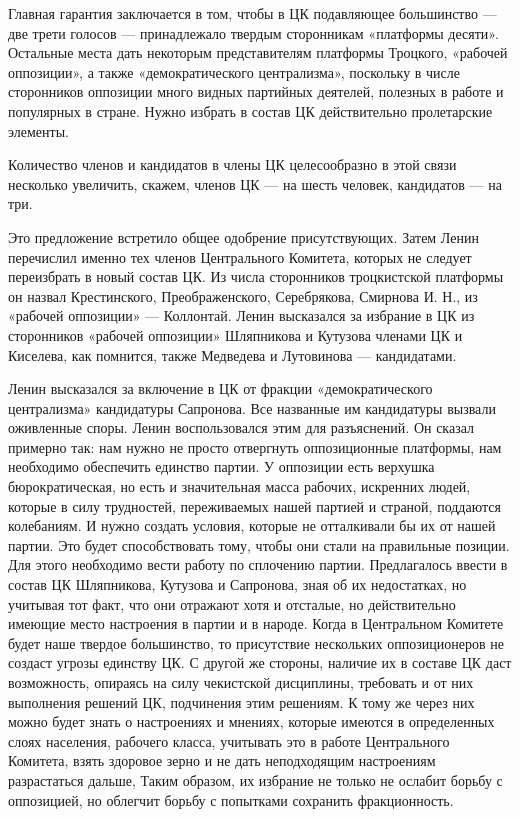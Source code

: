 \documentclass[12pt, a4paper, openany]{book}
\begin{document}
Главная гарантия заключается в том, чтобы в ЦК подавляющее большинство — две трети голосов — принадлежало твердым сторонникам «платформы десяти». Остальные места дать некоторым представителям платформы Троцкого, «рабочей оппозиции», а также «демократического централизма», поскольку в числе сторонников оппозиции много видных партийных деятелей, полезных в работе и популярных в стране. Нужно избрать в состав ЦК действительно пролетарские элементы.

Количество членов и кандидатов в члены ЦК целесообразно в этой связи несколько увеличить, скажем, членов ЦК — на шесть человек, кандидатов — на три.

Это предложение встретило общее одобрение присутствующих. Затем Ленин перечислил именно тех членов Центрального Комитета, которых не следует переизбрать в новый состав ЦК. Из числа сторонников троцкистской платформы он назвал Крестинского, Преображенского, Серебрякова, Смирнова И. Н., из «рабочей оппозиции» — Коллонтай. Ленин высказался за избрание в ЦК из сторонников «рабочей оппозиции» Шляпникова и Кутузова членами ЦК и Киселева, как помнится, также Медведева и Лутовинова — кандидатами.

Ленин высказался за включение в ЦК от фракции «демократического централизма» кандидатуры Сапронова. Все названные им кандидатуры вызвали оживленные споры. Ленин воспользовался этим для разъяснений. Он сказал примерно так: нам нужно не просто отвергнуть оппозиционные платформы, нам необходимо обеспечить единство партии. У оппозиции есть верхушка бюрократическая, но есть и значительная масса рабочих, искренних людей, которые в силу трудностей, переживаемых нашей партией и страной, поддаются колебаниям. И нужно создать условия, которые не отталкивали бы их от нашей партии. Это будет способствовать тому, чтобы они стали на правильные позиции. Для этого необходимо вести работу по сплочению партии. Предлагалось ввести в состав ЦК Шляпникова, Кутузова и Сапронова, зная об их недостатках, но учитывая тот факт, что они отражают хотя и отсталые, но действительно имеющие место настроения в партии и в народе. Когда в Центральном Комитете будет наше твердое большинство, то присутствие нескольких оппозиционеров не создаст угрозы единству ЦК. С другой же стороны, наличие их в составе ЦК даст возможность, опираясь на силу чекистской дисциплины, требовать и от них выполнения решений ЦК, подчинения этим решениям. К тому же через них можно будет знать о настроениях и мнениях, которые имеются в определенных слоях населения, рабочего класса, учитывать это в работе Центрального Комитета, взять здоровое зерно и не дать неподходящим настроениям разрастаться дальше, Таким образом, их избрание не только не ослабит борьбу с оппозицией, но облегчит борьбу с попытками сохранить фракционность.
\end{document}
